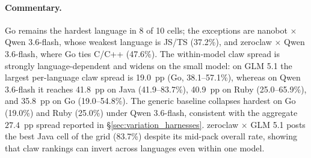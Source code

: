 \paragraph{Commentary.}
Go remains the hardest language in 8 of 10 cells; the exceptions are
nanobot $\times$ Qwen 3.6-flash, whose weakest language is JS/TS (37.2\%), and
zeroclaw $\times$ Qwen 3.6-flash, where Go ties C/C++ (47.6\%). The
within-model claw spread is strongly language-dependent and widens on the small
model: on GLM 5.1 the largest per-language claw spread is 19.0~pp (Go,
38.1--57.1\%), whereas on Qwen 3.6-flash it reaches 41.8~pp on Java
(41.9--83.7\%), 40.9~pp on Ruby (25.0--65.9\%), and 35.8~pp on Go
(19.0--54.8\%). The generic baseline collapses hardest on Go (19.0\%) and Ruby
(25.0\%) under Qwen 3.6-flash, consistent with the aggregate $27.4$~pp spread
reported in \S\ref{sec:variation_harnesses}. zeroclaw $\times$ GLM 5.1 posts
the best Java cell of the grid (83.7\%) despite its mid-pack overall rate,
showing that claw rankings can invert across languages even within one model.

